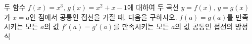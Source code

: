 두 함수 $f(x)=x^3$, $g(x)=x^2+x-1$에 대하여 두 곡선 $y=f(x)$, $y=g(x)$가 $x=a$인 점에서 공통인 접선을 가질 때, 다음을 구하시오.
 $f(a)=g(a)$를 만족시키는 모든 $a$의 값
 $f'(a)=g'(a)$를 만족시키는 모든 $a$의 값
 공통인 접선의 방정식
